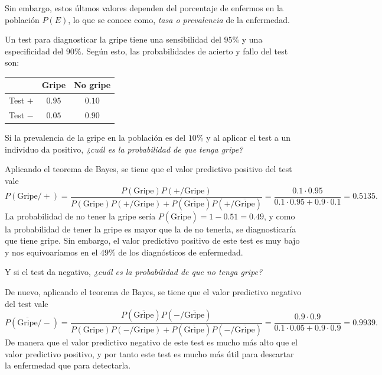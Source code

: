 Sin embargo, estos últmos valores dependen del porcentaje de enfermos en la población $P(E)$, lo que se conoce como, \emph{tasa
o prevalencia} de la enfermedad.

\begin{ejemplo}
Un test para diagnosticar la gripe tiene una sensibilidad del $95\%$ y una especificidad del $90\%$. 
Según esto, las probabilidades de
acierto y fallo del test son:
\begin{center}
\begin{tabular}{|c|c|c|}
\cline{2-3}
\multicolumn{1}{c|}{} & Gripe & No gripe\\ \hline
Test $+$ & $0.95$ & $0.10$\\ \hline
Test $-$ & $0.05$ & $0.90$\\ \hline
\end{tabular}
\end{center}

Si la prevalencia de la gripe en la población es del $10\%$ y al aplicar el test a un individuo da positivo, \emph{¿cuál es la probabilidad
de que tenga gripe?}

Aplicando el teorema de Bayes, se tiene que el valor predictivo positivo del test vale
\[
P(\mbox{Gripe}/+) = \frac{P(\mbox{Gripe})P(+/\mbox{Gripe})}{P(\mbox{Gripe})P(+/\mbox{Gripe})+P(\overline{\mbox{Gripe}})P(+/\overline{\mbox{Gripe}})}
= \frac{0.1\cdot 0.95}{0.1\cdot 0.95+0.9\cdot 0.1} = 0.5135.
\]
La probabilidad de no tener la gripe sería $P(\overline{\mbox{Gripe}})=1-0.51=0.49$, y como la probabilidad de tener la gripe es mayor que
la de no tenerla, se diagnosticaría que tiene gripe.
Sin embargo, el valor predictivo positivo de este test es muy bajo y nos equivoaríamos en el 49\% de los diagnósticos de enfermedad.

Y si el test da negativo, \emph{¿cuál es la probabilidad de que no tenga gripe?}

De nuevo, aplicando el teorema de Bayes, se tiene que el valor predictivo negativo del test vale
\[
P(\overline{\mbox{Gripe}}/-)=
\frac{P(\overline{\mbox{Gripe}})P(-/\overline{\mbox{Gripe}})}{P(\mbox{Gripe})P(-/\mbox{Gripe})+P(\overline{\mbox{Gripe}})P(-/\overline{\mbox{Gripe}})}
= \frac{0.9\cdot 0.9}{0.1\cdot 0.05+0.9\cdot 0.9} = 0.9939.
\]
De manera que el valor predictivo negativo de este test es mucho más alto que el valor predictivo positivo, y por tanto este test es mucho
más útil para descartar la enfermedad que para detectarla.
\end{ejemplo}


\clearpage
\newpage

